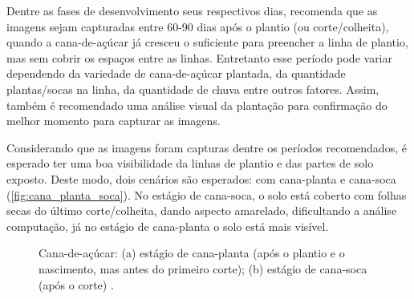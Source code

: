 \documentclass[12pt, a4paper, english, brazil]{article}
\begin{document}
Dentre as fases de desenvolvimento seus respectivos dias,  recomenda que as imagens sejam capturadas entre 60-90 dias após o plantio (ou corte/colheita), quando a cana-de-açúcar já cresceu o suficiente para preencher a linha de plantio, mas sem cobrir os espaços entre as linhas. Entretanto esse período pode variar dependendo da variedade de cana-de-açúcar plantada, da quantidade plantas/socas na linha, da quantidade de chuva entre outros fatores. Assim, também é recomendado uma análise visual da plantação para confirmação do melhor momento para capturar as imagens.

Considerando que as imagens foram capturas dentre os períodos recomendados, é esperado ter uma boa visibilidade da linhas de plantio e das partes de solo exposto. Deste modo, dois cenários são esperados: com cana-planta e cana-soca (\autoref{fig:cana_planta_soca}). No estágio de cana-soca, o solo está coberto com folhas secas do último corte/colheita, dando aspecto amarelado, dificultando a análise computação, já no estágio de cana-planta o solo está mais visível.

\begin{figure}[htbp]
    \centering
    \caption{Cana-de-açúcar: (a) estágio de cana-planta (após o plantio e o nascimento, mas antes do primeiro corte); (b) estágio de cana-soca (após o corte) \cite{Silva_2020}.}
    \label{fig:cana_planta_soca}
\end{figure}
\end{document}

